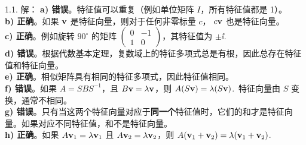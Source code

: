 \begin{exer}

1.1. 解：
\textbf{a) 错误}。特征值可以重复（例如单位矩阵 $I$，所有特征值都是 1）。\\
\textbf{b) 正确}。如果 $\mathbf{v}$ 是特征向量，则对于任何非零标量 $c$， $c\mathbf{v}$ 也是特征向量。\\
\textbf{c) 正确}。例如旋转 $90^\circ$ 的矩阵 $\begin{pmatrix} 0 & -1 \\ 1 & 0 \end{pmatrix}$，其特征值为 $\pm \ii$.~\\
\textbf{d) 错误}。根据代数基本定理，复数域上的特征多项式总是有根，因此总存在特征值和特征向量。\\
\textbf{e) 正确}。相似矩阵具有相同的特征多项式，因此特征值相同。\\
\textbf{f) 错误}。如果 $A = S B S^{-1}$，且 $B\mathbf{v} = \lambda \mathbf{v}$，则 $A(S\mathbf{v}) = \lambda (S\mathbf{v})$.~特征向量由 $S$ 变换，通常不相同。\\
\textbf{g) 错误}。只有当这两个特征向量对应于\textbf{同一个}特征值时，它们的和才是特征向量。如果对应不同特征值，和不是特征向量。\\
\textbf{h) 正确}。如果 $A\mathbf{v}_1 = \lambda \mathbf{v}_1$ 且 $A\mathbf{v}_2 = \lambda \mathbf{v}_2$，则 $A(\mathbf{v}_1+\mathbf{v}_2) = \lambda(\mathbf{v}_1+\mathbf{v}_2)$.~


\end{exer}
